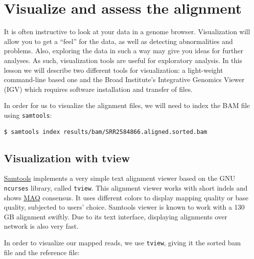 \documentclass[
  letterpaper,
  DIV=11,
  numbers=noendperiod]{scrreprt}
\newenvironment{Shaded}{\begin{snugshade}}{\end{snugshade}}
\newcommand{\ExtensionTok}[1]{\textcolor[rgb]{0.00,0.23,0.31}{#1}}
\newcommand{\NormalTok}[1]{\textcolor[rgb]{0.00,0.23,0.31}{#1}}
\begin{document}
\hypertarget{visualize-and-assess-the-alignment}{%
\section{Visualize and assess the
alignment}\label{visualize-and-assess-the-alignment}}

It is often instructive to look at your data in a genome browser.
Visualization will allow you to get a ``feel'' for the data, as well as
detecting abnormalities and problems. Also, exploring the data in such a
way may give you ideas for further analyses. As such, visualization
tools are useful for exploratory analysis. In this lesson we will
describe two different tools for visualization: a light-weight
command-line based one and the Broad Institute's Integrative Genomics
Viewer (IGV) which requires software installation and transfer of files.

In order for us to visualize the alignment files, we will need to index
the BAM file using \texttt{samtools}:

\begin{verbatim}
$ samtools index results/bam/SRR2584866.aligned.sorted.bam
\end{verbatim}

\hypertarget{visualization-with-tview}{%
\subsection{Visualization with tview}\label{visualization-with-tview}}

\href{http://www.htslib.org/}{Samtools} implements a very simple text
alignment viewer based on the GNU \texttt{ncurses} library, called
\texttt{tview}. This alignment viewer works with short indels and shows
\href{http://maq.sourceforge.net/}{MAQ} consensus. It uses different
colors to display mapping quality or base quality, subjected to users'
choice. Samtools viewer is known to work with a 130 GB alignment
swiftly. Due to its text interface, displaying alignments over network
is also very fast.

In order to visualize our mapped reads, we use \texttt{tview}, giving it
the sorted bam file and the reference file:

\begin{Shaded}
\end{Shaded}
\end{document}
